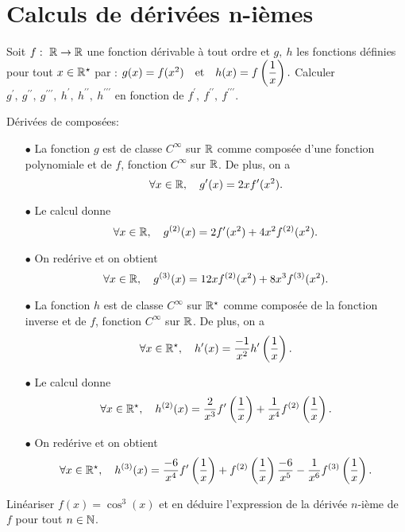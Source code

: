 \documentclass[a4paper, 11pt,reqno]{article}
\begin{document}
\noindent\section{\large{Calculs de d\'eriv\'ees n-i\`emes}}\vsec
\begin{exercice}   \;
	Soit $f:\ \mathbb{R}\rightarrow\mathbb{R}$ une fonction d\'erivable \`a tout ordre et $g,\ h$ les fonctions d\'efinies pour tout $x\in\mathbb{R}^{\star}$ par : $g(x)=f(x^2)\quad \hbox{et}\quad h(x)=f\left(\displaystyle\frac{1}{x} \right).$ Calculer $g^{\prime},\ g^{\prime\prime},\ g^{\prime\prime\prime},\ h^{\prime},\ h^{\prime\prime},\ h^{\prime\prime\prime}$ en fonction de $f^{\prime},\ f^{\prime\prime},\ f^{\prime\prime\prime}$.
\end{exercice}
\begin{correction}  \;
	D\'eriv\'ees de compos\'ees:
	\begin{itemize}
		\item[$\bullet$] La fonction $g$ est de classe $C^{\infty}$ sur $\mathbb{R}$ comme compos\'ee d'une fonction polynomiale et de $f$,
		      fonction $C^{\infty}$ sur $\mathbb{R}$. De plus, on a
		      $$\forall x\in\mathbb{R},\quad g^{\prime}(x)=2xf^{\prime}(x^2).$$
		\item[$\bullet$] Le calcul donne
		      $$\forall x\in\mathbb{R},\quad g^{(2)}(x)=2f^{\prime}(x^2)+4x^2f^{(2)}(x^2).$$
		\item[$\bullet$] On red\'erive et on obtient
		      $$\forall x\in\mathbb{R},\quad g^{(3)}(x)=12xf^{(2)}(x^2)+8x^3f^{(3)}(x^2).$$
		\item[$\bullet$] La fonction $h$ est de classe $C^{\infty}$ sur $\mathbb{R}^{\star}$ comme compos\'ee de la fonction inverse et de $f$,
		      fonction $C^{\infty}$ sur $\mathbb{R}$. De plus, on a
		      $$\forall x\in\mathbb{R}^{\star},\quad h^{\prime}(x)=\displaystyle\frac{-1}{x^2}h^{\prime}\left( \displaystyle\frac{1}{x}\right).$$
		\item[$\bullet$] Le calcul donne
		      $$\forall x\in\mathbb{R}^{\star},\quad h^{(2)}(x)=\displaystyle\frac{2}{x^3}f^{\prime}\left( \displaystyle\frac{1}{x}\right)+\displaystyle\frac{1}{x^4}f^{(2)}\left( \displaystyle\frac{1}{x} \right) .$$
		\item[$\bullet$] On red\'erive et on obtient
		      $$\forall x\in\mathbb{R}^{\star},\quad h^{(3)}(x)=\displaystyle\frac{-6}{x^4}f^{\prime}\left( \displaystyle\frac{1}{x}\right)+f^{(2)}\left( \displaystyle\frac{1}{x}\right) \displaystyle\frac{-6}{x^5}-\displaystyle\frac{1}{x^6}f^{(3)}\left( \displaystyle\frac{1}{x}\right).$$
	\end{itemize}
\end{correction}
\begin{exercice}   \;
	Lin\'eariser $f(x)=\cos^3{(x)}$ et en d\'eduire l'expression de la d\'eriv\'ee $n$-i\`{e}me de $f$ pour tout $n\in\mathbb{N}$.
\end{exercice}
\end{document}
